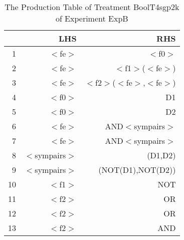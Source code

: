 \begin{table}[ht]
\centering
\begin{tabular}{rrr}
  \hline
 & LHS & RHS \\ 
  \hline
1 & $<$fe$>$ & $<$f0$>$ \\ 
  2 & $<$fe$>$ & $<$f1$>$($<$fe$>$) \\ 
  3 & $<$fe$>$ & $<$f2$>$($<$fe$>$,$<$fe$>$) \\ 
  4 & $<$f0$>$ & D1 \\ 
  5 & $<$f0$>$ & D2 \\ 
  6 & $<$fe$>$ & AND$<$sympairs$>$ \\ 
  7 & $<$fe$>$ & AND$<$sympairs$>$ \\ 
  8 & $<$sympairs$>$ & (D1,D2) \\ 
  9 & $<$sympairs$>$ & (NOT(D1),NOT(D2)) \\ 
  10 & $<$f1$>$ & NOT \\ 
  11 & $<$f2$>$ & OR \\ 
  12 & $<$f2$>$ & OR \\ 
  13 & $<$f2$>$ & AND \\ 
   \hline
\end{tabular}
\caption{The Production Table of Treatment BoolT4sgp2k of Experiment ExpB} 
\end{table}
